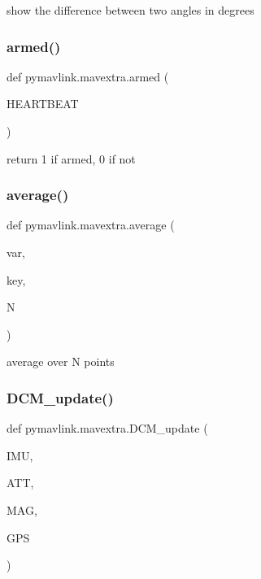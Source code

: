 \begin{DoxyVerb}show the difference between two angles in degrees\end{DoxyVerb}
 \mbox{\label{namespacepymavlink_1_1mavextra_a00f2c88d67afcae53f725e0d8105adb1}} 
\subsubsection{\texorpdfstring{armed()}{armed()}}
{\footnotesize\ttfamily def pymavlink.\+mavextra.\+armed (\begin{DoxyParamCaption}\item[{}]{H\+E\+A\+R\+T\+B\+E\+AT }\end{DoxyParamCaption})}

\begin{DoxyVerb}return 1 if armed, 0 if not\end{DoxyVerb}
 \mbox{\label{namespacepymavlink_1_1mavextra_a3953775074e771143256576a19fab8d3}} 
\subsubsection{\texorpdfstring{average()}{average()}}
{\footnotesize\ttfamily def pymavlink.\+mavextra.\+average (\begin{DoxyParamCaption}\item[{}]{var,  }\item[{}]{key,  }\item[{}]{N }\end{DoxyParamCaption})}

\begin{DoxyVerb}average over N points\end{DoxyVerb}
 \mbox{\label{namespacepymavlink_1_1mavextra_a602868624e22e520d6376334c46aed97}} 
\subsubsection{\texorpdfstring{D\+C\+M\+\_\+update()}{DCM\_update()}}
{\footnotesize\ttfamily def pymavlink.\+mavextra.\+D\+C\+M\+\_\+update (\begin{DoxyParamCaption}\item[{}]{I\+MU,  }\item[{}]{A\+TT,  }\item[{}]{M\+AG,  }\item[{}]{G\+PS }\end{DoxyParamCaption})}

